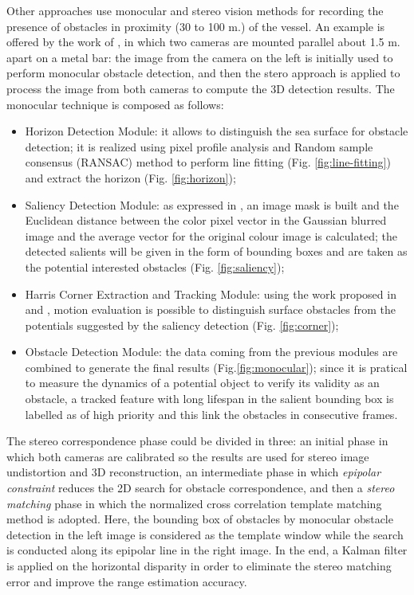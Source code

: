 \documentclass[12pt]{article}
\begin{document}
      \indent Other approaches use monocular and stereo vision methods for recording the presence of obstacles in proximity (30 to 100 m.) of the vessel. An example is offered by the work of \textcite{Wang2011,Wang2012}, in which two cameras are mounted parallel about 1.5 m. apart on a metal bar: the image from the camera on the left is initially used to perform monocular obstacle detection, and then the stero approach is applied to process the image from both cameras to compute the 3D detection results. The monocular technique is composed as follows:
            \begin{itemize}
                  \item Horizon Detection Module: it allows to distinguish the sea surface for obstacle detection; it is realized using pixel profile analysis and Random sample consensus (RANSAC) \parencite{Fischler1981} method to perform line fitting (Fig. \ref{fig:line-fitting}) and extract the horizon (Fig. \ref{fig:horizon});
                  \item Saliency Detection Module: as expressed in \parencite{Achanta2009}, an image mask is built and the Euclidean distance between the color pixel vector in the Gaussian blurred image and the average vector for the original colour image is calculated; the detected salients will be given in the form of bounding boxes and are taken as the potential interested obstacles (Fig. \ref{fig:saliency});
                  \item Harris Corner Extraction and Tracking Module: using the work proposed in \parencite{Harris1988} and \parencite{Bouguet1999}, motion evaluation is possible to distinguish surface obstacles from the potentials suggested by the saliency detection (Fig. \ref{fig:corner});
                  \item Obstacle Detection Module: the data coming from the previous modules are combined to generate the final results (Fig.\ref{fig:monocular}); since it is pratical to measure the dynamics of a potential object to verify its validity as an obstacle, a tracked feature with long lifespan in the salient bounding box is labelled as of high priority and this link the obstacles in consecutive frames.
            \end{itemize}
      \indent The stereo correspondence phase could be divided in three: an initial phase in which both cameras are calibrated so the results are used for stereo image undistortion and 3D reconstruction, an intermediate phase in which \textit{epipolar constraint} reduces the 2D search for obstacle correspondence, and then a \textit{stereo matching} phase in which the normalized cross correlation template matching method is adopted. Here, the bounding box of obstacles by monocular obstacle detection in the left image is considered as the template window while the search is conducted along its epipolar line in the right image. In the end, a Kalman filter is applied on the horizontal disparity in order to eliminate the stereo matching error and improve the range estimation accuracy.
\end{document}
